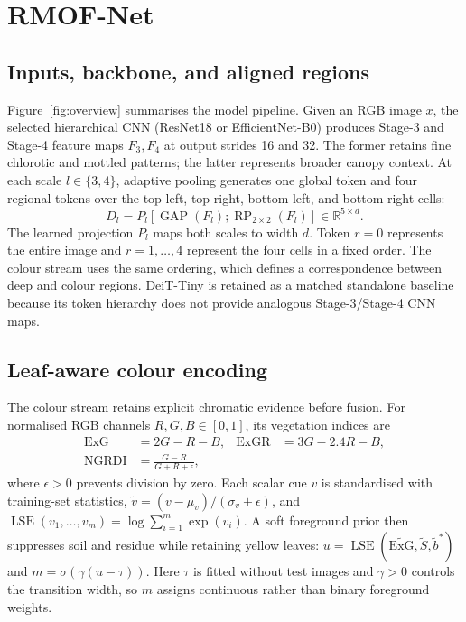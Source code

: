 \documentclass[10pt,letterpaper,twocolumn]{article}
\begin{document}
\section{RMOF-Net}

\subsection{Inputs, backbone, and aligned regions}

Figure~\ref{fig:overview} summarises the model pipeline. Given an RGB image $x$, the selected hierarchical CNN (ResNet18 or EfficientNet-B0) produces Stage-3 and Stage-4 feature maps $F_3,F_4$ at output strides 16 and 32. The former retains fine chlorotic and mottled patterns; the latter represents broader canopy context. At each scale $l\in\{3,4\}$, adaptive pooling generates one global token and four regional tokens over the top-left, top-right, bottom-left, and bottom-right cells:
\begin{equation}
D_l=P_l[\operatorname{GAP}(F_l);\operatorname{RP}_{2\times2}(F_l)]\in\mathbb{R}^{5\times d}.
\label{eq:deep}
\end{equation}
The learned projection $P_l$ maps both scales to width $d$. Token $r=0$ represents the entire image and $r=1,\ldots,4$ represent the four cells in a fixed order. The colour stream uses the same ordering, which defines a correspondence between deep and colour regions. DeiT-Tiny is retained as a matched standalone baseline because its token hierarchy does not provide analogous Stage-3/Stage-4 CNN maps.

\subsection{Leaf-aware colour encoding}

The colour stream retains explicit chromatic evidence before fusion. For normalised RGB channels $R,G,B\in[0,1]$, its vegetation indices are
\begin{equation}
\begin{aligned}
\mathrm{ExG}&=2G-R-B, & \mathrm{ExGR}&=3G-2.4R-B,\\[-2pt]
\mathrm{NGRDI}&=\frac{G-R}{G+R+\epsilon},
\end{aligned}
\label{eq:indices}
\end{equation}
where $\epsilon>0$ prevents division by zero. Each scalar cue $v$ is standardised with training-set statistics, $\widetilde v=(v-\mu_v)/(\sigma_v+\epsilon)$, and $\operatorname{LSE}(v_1,\ldots,v_m)=\log\sum_{i=1}^{m}\exp(v_i)$. A soft foreground prior then suppresses soil and residue while retaining yellow leaves: $u=\operatorname{LSE}(\widetilde{\mathrm{ExG}},\widetilde S,\widetilde b^{*})$ and $m=\sigma(\gamma(u-\tau))$. Here $\tau$ is fitted without test images and $\gamma>0$ controls the transition width, so $m$ assigns continuous rather than binary foreground weights.
\end{document}
